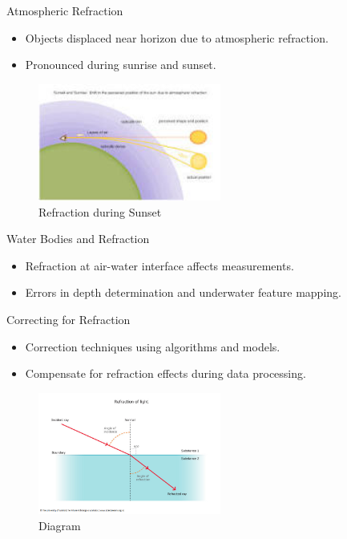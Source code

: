 \documentclass{beamer}
\begin{document}
\begin{frame}{Atmospheric Refraction}
  \begin{itemize}
    \item Objects displaced near horizon due to atmospheric refraction.
    \item Pronounced during sunrise and sunset.
  \end{itemize}
  \begin{figure}
    \centering
      \includegraphics[width=6cm]{atm_refraction.jpeg}
      \caption{Refraction during Sunset}
      \label{fig:Light}
    \centering
  \end{figure}
\end{frame}

\begin{frame}{Water Bodies and Refraction}
  \begin{itemize}
    \item Refraction at air-water interface affects measurements.
    \item Errors in depth determination and underwater feature mapping.
  \end{itemize}
\end{frame}

\begin{frame}{Correcting for Refraction}
  \begin{itemize}
    \item Correction techniques using algorithms and models.
    \item Compensate for refraction effects during data processing.
  \end{itemize}
  \begin{figure}
    \centering
      \includegraphics[width=6cm]{RefractionImage.png}
      \caption{Diagram}
      \label{fig:Light}
    \centering
  \end{figure}
\end{frame}
\end{document}
